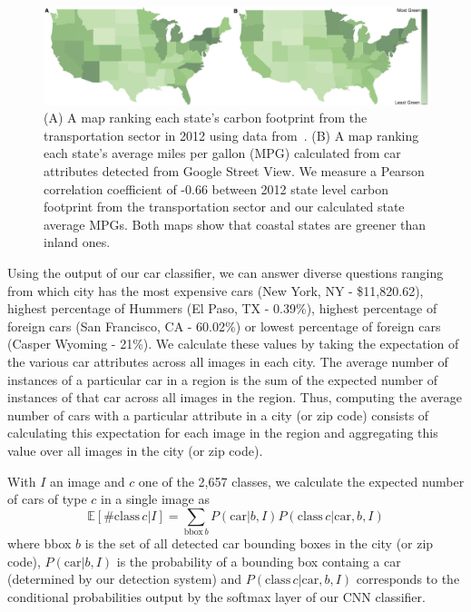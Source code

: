 \documentclass[letterpaper]{article}
\begin{document}
\begin{figure} [t]
\begin{center}
\includegraphics[width=1.0\linewidth]{img/green.jpg}
\end{center}
\caption {(A) A map ranking each state's carbon footprint from the transportation sector in 2012 using data from~\cite{state_ranking}. (B) A map ranking each state's average miles per gallon (MPG) calculated from car attributes detected from Google Street View. We measure a Pearson correlation coefficient of -0.66 between 2012 state level carbon footprint from the transportation sector and our calculated state average MPGs. Both maps show that coastal states are greener than inland ones.}
\label{fig:mpg}
\end{figure}
Using the output of our car classifier, we can answer diverse questions ranging from which city has the most expensive cars (New York, NY - \$11,820.62), highest percentage of Hummers (El Paso, TX - 0.39\%), highest percentage of foreign cars (San Francisco, CA - 60.02\%) or lowest percentage of foreign cars (Casper Wyoming - 21\%). We calculate these values by taking the expectation of the various car attributes across all images in each city. The average number of instances of a particular car in a region is the sum of the expected number of instances of that car across all images in the region. Thus, computing the average number of cars with a particular attribute in a city (or zip code) consists of calculating this expectation for each image in the region and aggregating this value over all images in the city (or zip code).

With $I$ an image and $c$ one of the 2,657 classes, we calculate the expected number of cars of type $c$ in a single image as
\begin{equation}
\mathbb{E}[\mathrm{\#class}\, c | I] = \sum_{\mathrm{bbox}\,b} P(\mathrm{car}|b,I) P(\mathrm{class}\, c | \mathrm{car},b,I)
\end{equation}
where bbox $b$ is the set of all detected car bounding boxes in the city (or zip code), $P(\mathrm{car}|b,I)$ is the probability of a bounding box containg a car (determined by our detection system) and $P(\mathrm{class}\, c | \mathrm{car},b,I)$ corresponds to the conditional probabilities output by the softmax layer of our CNN classifier.
\end{document}
